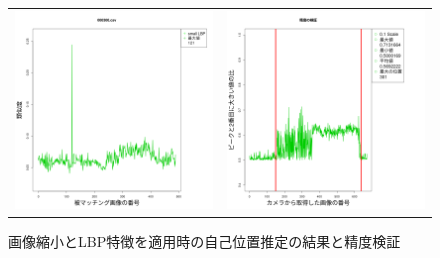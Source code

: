 \documentclass[titlepage,dvipdfmx]{jsarticle}
\begin{document}
\begin{figure}[H]
  \centering
  \begin{tabular}{cc}
    \begin{minipage}[b]{0.5\linewidth}
      \centering
      \includegraphics[pagebox=cropbox, scale=0.25]{sotuken_png/resultSLBP_000300.png}
    \end{minipage}
    &
    \begin{minipage}[b]{0.5\linewidth}
      \centering
      \includegraphics[pagebox=cropbox, scale=0.25]{sotuken_png/peak/peak_LBP_small.png}
    \end{minipage}
  \end{tabular}
  \caption{画像縮小とLBP特徴を適用時の自己位置推定の結果と精度検証}
  \label{SLBPR}
\end{figure}
\end{document}
